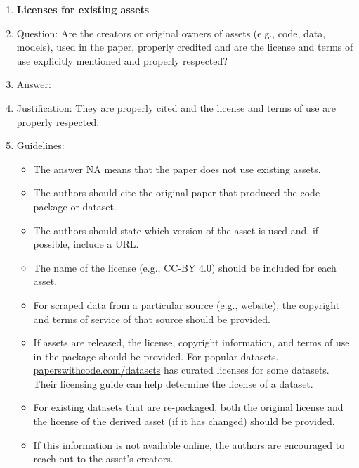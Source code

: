 \documentclass{article}
\begin{document}
\begin{enumerate}
\item {\bf Licenses for existing assets}
    \item[] Question: Are the creators or original owners of assets (e.g., code, data, models), used in the paper, properly credited and are the license and terms of use explicitly mentioned and properly respected?
    \item[] Answer: \answerYes{} %
    \item[] Justification: They are properly cited and the license and terms of use are properly respected.
    \item[] Guidelines:
    \begin{itemize}
        \item The answer NA means that the paper does not use existing assets.
        \item The authors should cite the original paper that produced the code package or dataset.
        \item The authors should state which version of the asset is used and, if possible, include a URL.
        \item The name of the license (e.g., CC-BY 4.0) should be included for each asset.
        \item For scraped data from a particular source (e.g., website), the copyright and terms of service of that source should be provided.
        \item If assets are released, the license, copyright information, and terms of use in the package should be provided. For popular datasets, \url{paperswithcode.com/datasets} has curated licenses for some datasets. Their licensing guide can help determine the license of a dataset.
        \item For existing datasets that are re-packaged, both the original license and the license of the derived asset (if it has changed) should be provided.
        \item If this information is not available online, the authors are encouraged to reach out to the asset's creators.
    \end{itemize}


\end{enumerate}
\end{document}
